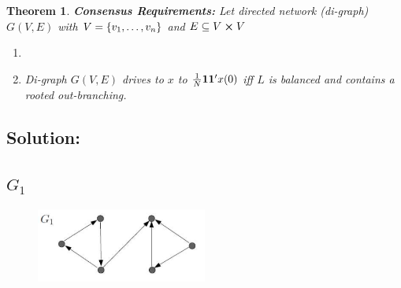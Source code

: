\documentclass[]{article}
\numberwithin{equation}{section}
\newtheorem{theorem}{Theorem}
\begin{document}
\begin{theorem}
    \textbf{Consensus Requirements:}
    Let directed network (di-graph) $G(V,E)$ with $V = \qty{v_1,\dots,v_n}$ and $E \subseteq V \cross V$
    \begin{enumerate}
        \item 
        \item Di-graph $G(V,E)$ drives to $x$ to $\frac{1}{N} \vb{1} \vb{1}' x(0)$ iff $L$ is balanced and contains a rooted out-branching.
    \end{enumerate}
\end{theorem}

\subsection*{Solution:}
\subsection{$G_1$}
\begin{figure}[h]
    \centering
    \includegraphics[width=0.5\textwidth]{figs/pblm6a.png}
\end{figure}
\end{document}
